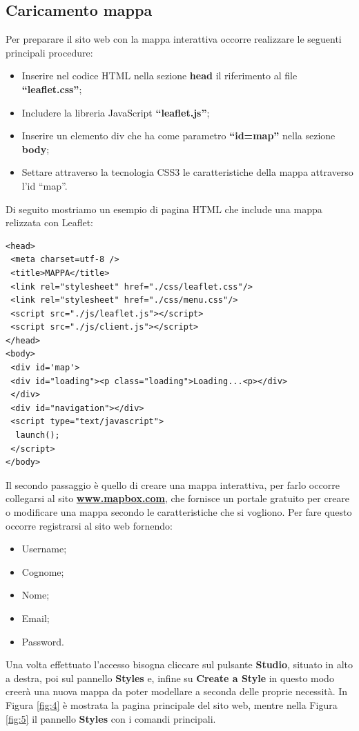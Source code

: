 \documentclass[a4paper,11pt]{article}
\begin{document}
\subsection{Caricamento mappa}
\label{sec:3.1}
Per preparare il sito web con la mappa interattiva occorre realizzare le seguenti principali procedure:
\begin{itemize}
	\item Inserire nel codice HTML nella sezione \textbf{head} il riferimento al file \textbf{"`leaflet.css"'};
	\item Includere la libreria JavaScript \textbf{"`leaflet.js"'};
	\item Inserire un elemento div che ha come parametro \textbf{"`id=map"'} nella sezione \textbf{body};
	\item Settare attraverso la tecnologia CSS3 le caratteristiche della mappa attraverso l'id "`map"'.				
\end{itemize}
Di seguito mostriamo un esempio di pagina HTML che include una mappa relizzata con Leaflet:
\begin{lstlisting}[style=htmlcssjs]
<head>
 <meta charset=utf-8 />
 <title>MAPPA</title>
 <link rel="stylesheet" href="./css/leaflet.css"/>
 <link rel="stylesheet" href="./css/menu.css"/>		
 <script src="./js/leaflet.js"></script>
 <script src="./js/client.js"></script>		
</head>
<body>		
 <div id='map'>
 <div id="loading"><p class="loading">Loading...<p></div>
 </div>					
 <div id="navigation"></div>		
 <script type="text/javascript">
  launch();
 </script>
</body>
\end{lstlisting}
Il secondo passaggio è quello di creare una mappa interattiva, per farlo occorre collegarsi al sito \textbf{\url{www.mapbox.com}}, che fornisce un portale gratuito per creare o modificare una mappa secondo le caratteristiche che si vogliono.
Per fare questo occorre registrarsi al sito web fornendo:
\begin{itemize}
	\item Username;
	\item Cognome;
	\item Nome;
	\item Email;
	\item Password.
\end{itemize}
Una volta effettuato l'accesso bisogna cliccare sul pulsante \textbf{Studio}, situato in alto a destra, poi sul pannello \textbf{Styles} e, infine su \textbf{Create a Style} in questo modo creerà una nuova mappa da poter modellare a seconda delle proprie necessità. In Figura \ref{fig:4} è mostrata la pagina principale del sito web, mentre nella Figura \ref{fig:5} il pannello \textbf{Styles} con i comandi principali.
\end{document}
